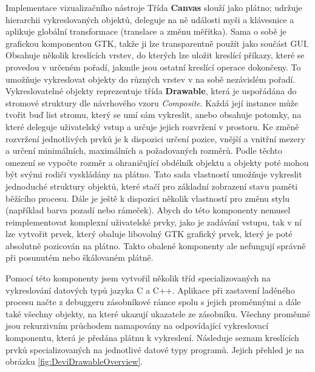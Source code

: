 \documentclass[czech,bachelor,male,python,dept460]{diploma}						%
\newcommand{\parspace}[1][]{
	\ifthenelse{\isempty{#1}}{\vspace{5mm}}{\vspace{#1}}
	\par
}
\begin{document}
\begin{section}{Implementace vizualizačního nástroje}
	Třída \textbf{Canvas} slouží jako plátno; udržuje hierarchii vykreslovaných objektů, deleguje na ně události myši a klávesnice a aplikuje globální transformace
	(translace a změnu měřítka). Sama o sobě je grafickou komponentou GTK, takže ji lze transparentně použít jako součást GUI.
	Obsahuje několik kreslících vrstev, do kterých lze uložit kreslící příkazy, které se provedou v určeném pořadí, jakmile jsou ostatní kreslící operace dokončeny.
	To umožňuje vykreslovat objekty do různých vrstev v na sobě nezávislém pořadí.
	Vykreslovatelné objekty reprezentuje třída \textbf{Drawable}, která je uspořádána do stromové struktury dle návrhového vzoru
	\textit{Composite}\cite[183]{gof}. Každá její instance může tvořit buď list stromu, který se umí sám vykreslit, anebo obsahuje potomky, na které deleguje
	uživatelský vstup a určuje jejich rozvržení v prostoru. Ke změně rozvržení jednotlivých prvků je k dispozici určení pozice, vnější a vnitřní mezery
	a určení minimálních, maximálních a požadovaných rozměrů. Podle těchto omezení se vypočte rozměr a ohraničující obdélník objektu a objekty poté mohou být
	svými rodiči vyskládány na plátno.
	Tato sada vlastností umožňuje vykreslit jednoduché struktury objektů, které stačí pro základní zobrazení stavu paměti běžícího procesu.
	Dále je ještě k dispozici několik vlastností pro změnu stylu (například barva pozadí nebo rámeček). Abych do této komponenty
	nemusel reimplementovat komplexní uživatelské prvky, jako je zadávání vstupu, tak v ní lze vytvořit prvek, který obaluje libovolný GTK grafický prvek,
	který je poté absolutně pozicován na plátno.
	Takto obalené komponenty ale nefungují správně při posunutém nebo škálovaném plátně. %
	
	\parspace Pomocí této komponenty jsem vytvořil několik tříd specializovaných na vykreslování datových typů jazyka C a C++. Aplikace při zastavení laděného
	procesu načte z debuggeru zásobníkové rámce spolu s jejich proměnnými a dále také všechny objekty, na které ukazují ukazatele ze zásobníku.
	Všechny proměnné jsou rekurzivním průchodem namapovány na odpovídající vykreslovací komponentu, která je předána plátnu k vykreslení.
	Následuje seznam kreslících prvků specializovaných na jednotlivé datové typy programů. Jejich přehled je na obrázku \ref{fig:DeviDrawableOverview}.
	

\end{section}
\end{document}
